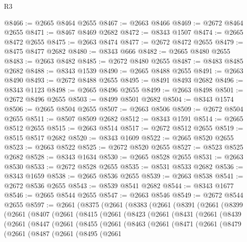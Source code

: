 \begin{lexlean}{R3}
\begin{coremodule}
@8466 := @2665 @8464 @2655
@8467 := @2663 @8466
@8469 := @2672 @8464 @2655
@8471 := @8467 @8469 @2682
@8472 := @8343 @1507
@8474 := @2665 @8472 @2655
@8475 := @2663 @8474
@8477 := @2672 @8472 @2655
@8479 := @8475 @8477 @2682
@8480 := @8343 @666
@8482 := @2665 @8480 @2655
@8483 := @2663 @8482
@8485 := @2672 @8480 @2655
@8487 := @8483 @8485 @2682
@8488 := @8343 @1539
@8490 := @2665 @8488 @2655
@8491 := @2663 @8490
@8493 := @2672 @8488 @2655
@8495 := @8491 @8493 @2682
@8496 := @8343 @1123
@8498 := @2665 @8496 @2655
@8499 := @2663 @8498
@8501 := @2672 @8496 @2655
@8503 := @8499 @8501 @2682
@8504 := @8343 @1574
@8506 := @2665 @8504 @2655
@8507 := @2663 @8506
@8509 := @2672 @8504 @2655
@8511 := @8507 @8509 @2682
@8512 := @8343 @1591
@8514 := @2665 @8512 @2655
@8515 := @2663 @8514
@8517 := @2672 @8512 @2655
@8519 := @8515 @8517 @2682
@8520 := @8343 @1609
@8522 := @2665 @8520 @2655
@8523 := @2663 @8522
@8525 := @2672 @8520 @2655
@8527 := @8523 @8525 @2682
@8528 := @8343 @1634
@8530 := @2665 @8528 @2655
@8531 := @2663 @8530
@8533 := @2672 @8528 @2655
@8535 := @8531 @8533 @2682
@8536 := @8343 @1659
@8538 := @2665 @8536 @2655
@8539 := @2663 @8538
@8541 := @2672 @8536 @2655
@8543 := @8539 @8541 @2682
@8544 := @8343 @1677
@8546 := @2665 @8544 @2655
@8547 := @2663 @8546
@8549 := @2672 @8544 @2655
@8597 := @2661
    (@8375
      (@2661
        (@8383
          (@2661
            (@8391
              (@2661
                (@8399
                  (@2661
                    (@8407
                      (@2661
                        (@8415
                          (@2661
                            (@8423
                              (@2661
                                (@8431
                                  (@2661
                                    (@8439
                                      (@2661
                                        (@8447
                                          (@2661
                                            (@8455
                                              (@2661
                                                (@8463
                                                  (@2661
                                                    (@8471
                                                      (@2661
                                                        (@8479
                                                          (@2661
                                                            (@8487
                                                              (@2661
                                                                (@8495
                                                                  (@2661

\end{coremodule}
\end{lexlean}
